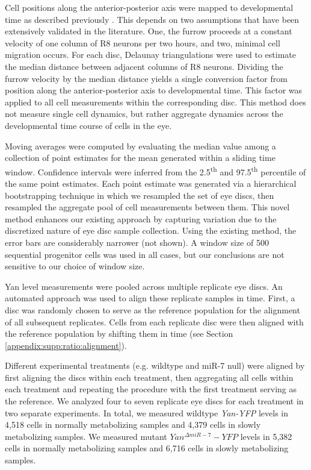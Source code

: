 Cell positions along the anterior-posterior axis were mapped to developmental time as described previously \cite{Pelaez2015a}. This depends on two assumptions that have been extensively validated in the literature. One, the furrow proceeds at a constant velocity of one column of R8 neurons per two hours, and two, minimal cell migration occurs. For each disc, Delaunay triangulations were used to estimate the median distance between adjacent columns of R8 neurons. Dividing the furrow velocity by the median distance yields a single conversion factor from position along the anterior-posterior axis to developmental time. This factor was applied to all cell measurements within the corresponding disc. This method does not measure single cell dynamics, but rather aggregate dynamics across the developmental time course of cells in the eye.

Moving averages were computed by evaluating the median value among a collection of point estimates for the mean generated within a sliding time window. Confidence intervals were inferred from the 2.5\textsuperscript{th} and 97.5\textsuperscript{th} percentile of the same point estimates. Each point estimate was generated via a hierarchical bootstrapping technique in which we resampled the set of eye discs, then resampled the aggregate pool of cell measurements between them. This novel method enhances our existing approach \cite{Pelaez2015a} by capturing variation due to the discretized nature of eye disc sample collection. Using the existing method, the error bars are considerably narrower (not shown). A window size of 500 sequential progenitor cells was used in all cases, but our conclusions are not sensitive to our choice of window size.

Yan level measurements were pooled across multiple replicate eye discs. An automated approach was used to align these replicate samples in time. First, a disc was randomly chosen to serve as the reference population for the alignment of all subsequent replicates. Cells from each replicate disc were then aligned with the reference population by shifting them in time (see Section \ref{appendix:supp:ratio:alignment}).

Different experimental treatments (e.g. wildtype and miR-7 null) were aligned by first aligning the discs within each treatment, then aggregating all cells within each treatment and repeating the procedure with the first treatment serving as the reference. We analyzed four to seven replicate eye discs for each treatment in two separate experiments. In total, we measured wildtype \textit{Yan-YFP} levels in 4,518 cells in normally metabolizing samples and 4,379 cells in slowly metabolizing samples. We measured mutant $Yan^{\Delta miR-7}-YFP$ levels in 5,382 cells in normally metabolizing samples and 6,716 cells in slowly metabolizing samples.

